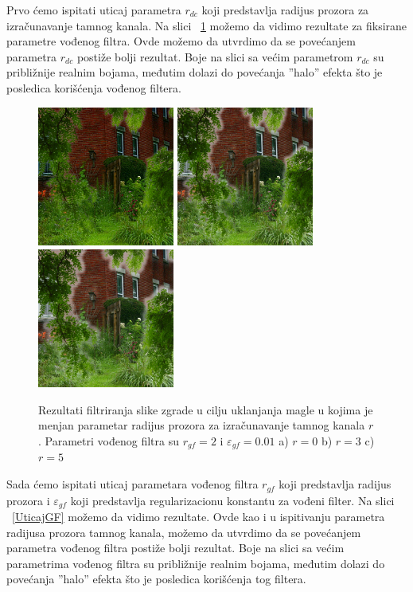 \documentclass[a4paper,12pt,titlepage]{article}
\begin{document}
Prvo ćemo ispitati uticaj parametra $r_{dc}$ koji predstavlja radijus prozora za izračunavanje tamnog kanala. Na slici ~\ref{UticajRdc} možemo da vidimo rezultate za fiksirane parametre vođenog filtra. Ovde možemo da utvrdimo da se povećanjem parametra $r_{dc}$ postiže bolji rezultat. Boje na slici sa većim parametrom $r_{dc}$ su približnije realnim bojama, međutim dolazi do povećanja ''halo'' efekta što je posledica korišćenja vođenog filtera.  

\begin{figure}[ht!]
\centering
\includegraphics[width=45mm]{img/hazeResDC0.png}
\includegraphics[width=45mm]{img/hazeResDC3.png}
\includegraphics[width=45mm]{img/hazeResDC5.png}
\caption{Rezultati filtriranja slike zgrade u cilju uklanjanja magle u kojima je menjan parametar radijus prozora za izračunavanje tamnog kanala $r$. Parametri vođenog filtra su $r_{gf} = 2$ i  $\varepsilon_{gf} = 0.01$ a) $r = 0$ b) $r = 3$ c) $r = 5$}
\label{UticajRdc}
\end{figure}  

Sada ćemo ispitati uticaj parametara vođenog filtra $r_{gf}$ koji predstavlja radijus prozora i $\varepsilon_{gf}$ koji predstavlja  regularizacionu konstantu za vođeni filter. Na slici ~\ref{UticajGF} možemo da vidimo rezultate. Ovde kao i u ispitivanju parametra radijusa prozora tamnog kanala, možemo da utvrdimo da se povećanjem parametra vođenog filtra postiže bolji rezultat. Boje na slici sa većim parametrima vođenog filtra su približnije realnim bojama, međutim dolazi do povećanja ''halo'' efekta što je posledica korišćenja tog filtera. 
\end{document}
